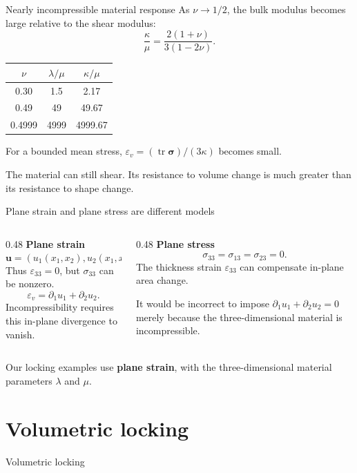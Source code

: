 \documentclass[11pt,aspectratio=169]{beamer}
\newcommand{\bu}{\bm u}
\newcommand{\bsig}{\bm\sigma}
\DeclareMathOperator{\tr}{tr}
\begin{document}
\begin{frame}{Nearly incompressible material response}
As $\nu\to1/2$, the bulk modulus becomes large relative to the shear modulus:
\[
\frac{\kappa}{\mu}=\frac{2(1+\nu)}{3(1-2\nu)}.
\]
\begin{center}
\begin{tabular}{ccc}
\toprule
$\nu$ & $\lambda/\mu$ & $\kappa/\mu$\\
\midrule
0.30 & 1.5 & 2.17\\
0.49 & 49 & 49.67\\
0.4999 & 4999 & 4999.67\\
\bottomrule
\end{tabular}
\end{center}
For a bounded mean stress, $\varepsilon_v=(\tr\bsig)/(3\kappa)$ becomes small.

The material can still shear. Its resistance to volume change is much
greater than its resistance to shape change.
\end{frame}

\begin{frame}{Plane strain and plane stress are different models}
\begin{columns}[T,onlytextwidth]
\begin{column}{0.48\textwidth}
\textbf{Plane strain}
\[
\bu=(u_1(x_1,x_2),u_2(x_1,x_2),0)^T.
\]
Thus $\varepsilon_{33}=0$, but $\sigma_{33}$ can be nonzero.
\[
\varepsilon_v=\partial_1u_1+\partial_2u_2.
\]
Incompressibility requires this in-plane divergence to vanish.
\end{column}
\begin{column}{0.48\textwidth}
\textbf{Plane stress}
\[
\sigma_{33}=\sigma_{13}=\sigma_{23}=0.
\]
The thickness strain $\varepsilon_{33}$ can compensate in-plane area change.

It would be incorrect to impose
$\partial_1u_1+\partial_2u_2=0$ merely because the three-dimensional material
is incompressible.
\end{column}
\end{columns}
\vspace{0.35cm}
Our locking examples use \textbf{plane strain}, with the three-dimensional
material parameters $\lambda$ and $\mu$.
\end{frame}

\section{Volumetric locking}
\begin{frame}
\centering\vfill
{\LARGE Volumetric locking\par}
\vfill
\end{frame}
\end{document}
